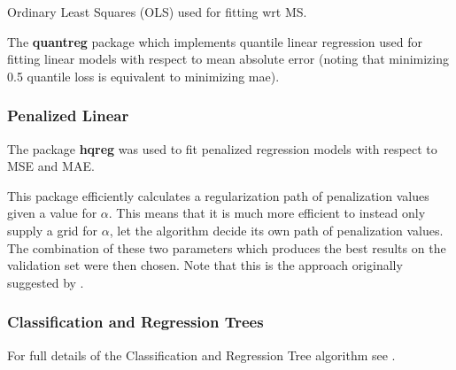 \documentclass[11pt, a4paper, table]{article}
\begin{document}
Ordinary Least Squares (OLS) used for fitting wrt MS.

The \textbf{quantreg} package which implements quantile linear regression used for fitting linear models with respect to mean absolute error (noting that minimizing 0.5 quantile loss is equivalent to minimizing mae).

\subsubsection{Penalized Linear}

The package \textbf{hqreg} was used to fit penalized regression models with respect to MSE and MAE.

This package efficiently calculates a regularization path of penalization values given a value for $\alpha$. This means that it is much more efficient to instead only supply a grid for $\alpha$, let the algorithm decide its own path of penalization values. The combination of these two parameters which produces the best results on the validation set were then chosen. Note that this is the approach originally suggested by \cite{zou_regularization_2005}.

\subsubsection{Classification and Regression Trees}

For full details of the Classification and Regression Tree algorithm see \cite{breiman_classification_1984}. 
\end{document}

